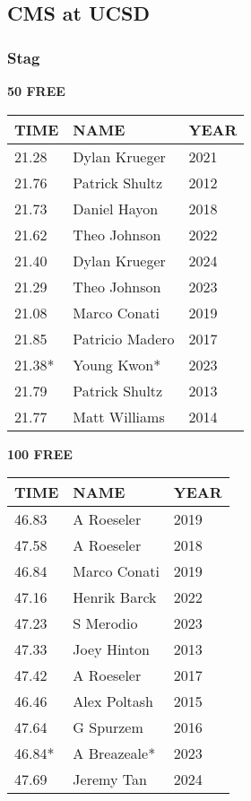 
\newpage

\subsection{CMS at UCSD}
\subsubsection{Stag}

\begin{table}[H]
\centering
\begin{minipage}[t]{0.48\textwidth}
\centering
\textbf{50 FREE}\\[0.1cm]
\begin{tabular}{@{}p{1.8cm}p{2.8cm}p{1.2cm}@{}}
\hline
    \textbf{TIME} & \textbf{NAME} & \textbf{YEAR} \\
\hline
    21.28 & Dylan Krueger & 2021 \\
    21.76 & Patrick Shultz & 2012 \\
    21.73 & Daniel Hayon & 2018 \\
    21.62 & Theo Johnson & 2022 \\
    21.40 & Dylan Krueger & 2024 \\
    21.29 & Theo Johnson & 2023 \\
    21.08 & Marco Conati & 2019 \\
    21.85 & Patricio Madero & 2017 \\
    21.38* & Young Kwon* & 2023 \\
    21.79 & Patrick Shultz & 2013 \\
    21.77 & Matt Williams & 2014 \\
\hline
\end{tabular}
\end{minipage}\hfill
\begin{minipage}[t]{0.48\textwidth}
\centering
\textbf{100 FREE}\\[0.1cm]
\begin{tabular}{@{}p{1.8cm}p{2.8cm}p{1.2cm}@{}}
\hline
    \textbf{TIME} & \textbf{NAME} & \textbf{YEAR} \\
\hline
    46.83 & A Roeseler & 2019 \\
    47.58 & A Roeseler & 2018 \\
    46.84 & Marco Conati & 2019 \\
    47.16 & Henrik Barck & 2022 \\
    47.23 & S Merodio & 2023 \\
    47.33 & Joey Hinton & 2013 \\
    47.42 & A Roeseler & 2017 \\
    46.46 & Alex Poltash & 2015 \\
    47.64 & G Spurzem & 2016 \\
    46.84* & A Breazeale* & 2023 \\
    47.69 & Jeremy Tan & 2024 \\
\hline
\end{tabular}
\end{minipage}
\end{table}


